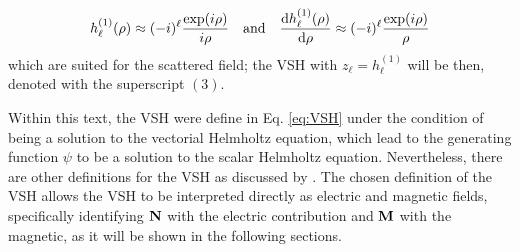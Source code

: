 %
%
%
\begin{align}
	h_\ell^{(1)}(\rho)\approx (-i)^\ell \frac{\exp(i\rho)}{i\rho}
		\qqtext{and}
	\dv{h_\ell^{(1)}(\rho)}{\rho} \approx (-i)^\ell \frac{\exp(i\rho)}{\rho}
\end{align}
which are suited for the scattered field; the VSH with $z_\ell = h^{(1)}_\ell$ will be then, denoted with the superscript $(3)$.

Within this text, the VSH were define in Eq. \eqref{eq:VSH} under the condition of being a solution to the vectorial Helmholtz equation, which lead to the generating function $\psi$ to be a solution to the scalar Helmholtz equation. Nevertheless, there are other definitions for the VSH as discussed by \citeauthor{barrera_vector_1985} \cite{barrera_vector_1985}. The chosen definition of the VSH allows the VSH to be interpreted directly as electric and magnetic fields, specifically identifying $\vb{N}$ with the electric contribution and $\vb{M}$ with the magnetic, as it will be shown in the following sections.
